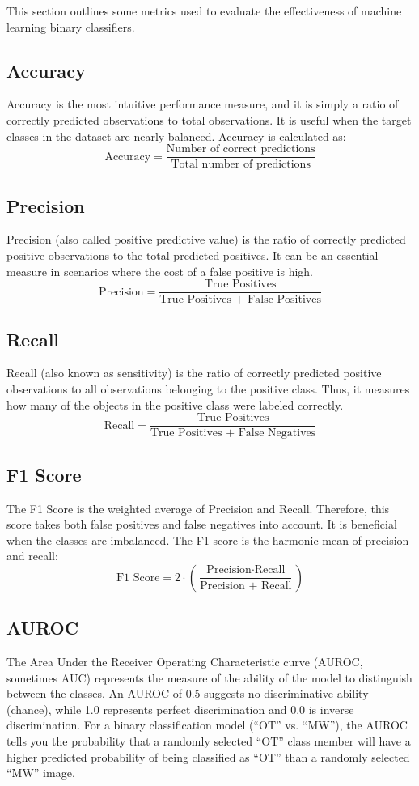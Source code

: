 This section outlines some metrics used to evaluate the effectiveness of machine learning binary classifiers\cite{rainio2024evaluation}.

\subsection{Accuracy}
Accuracy is the most intuitive performance measure, and it is simply a ratio of correctly predicted observations to total observations. It is useful when the target classes in the dataset are nearly balanced. Accuracy is calculated as: 
\[
\text{Accuracy} = \frac{\text{Number of correct predictions}}{\text{Total number of predictions}}
\]

\subsection{Precision}
Precision (also called positive predictive value) is the ratio of correctly predicted positive observations to the total predicted positives. It can be an essential measure in scenarios where the cost of a false positive is high.
\[
\text{Precision} = \frac{\text{True Positives}}{\text{True Positives + False Positives}}
\]

\subsection{Recall}
Recall (also known as sensitivity) is the ratio of correctly predicted positive observations to all observations belonging to the positive class. Thus, it measures how many of the objects in the positive class were labeled correctly.
\[
\text{Recall} = \frac{\text{True Positives}}{\text{True Positives + False Negatives}}
\]

\subsection{F1 Score}
The F1 Score is the weighted average of Precision and Recall. Therefore, this score takes both false positives and false negatives into account. It is beneficial when the classes are imbalanced. The F1 score is the harmonic mean of precision and recall: 
\[
\text{F1 Score} = 2 \cdot \left(\frac{\text{Precision} \cdot \text{Recall}}{\text{Precision + Recall}}\right)
\]

\subsection{AUROC}
The Area Under the Receiver Operating Characteristic curve (AUROC, sometimes AUC) represents the measure of the ability of the model to distinguish between the classes. An AUROC of 0.5 suggests no discriminative ability (chance), while 1.0 represents perfect discrimination and 0.0 is inverse discrimination. For a binary classification model (“OT” vs. “MW”), the AUROC tells you the probability that a randomly selected “OT” class member will have a higher predicted probability of being classified as “OT” than a randomly selected “MW” image.

